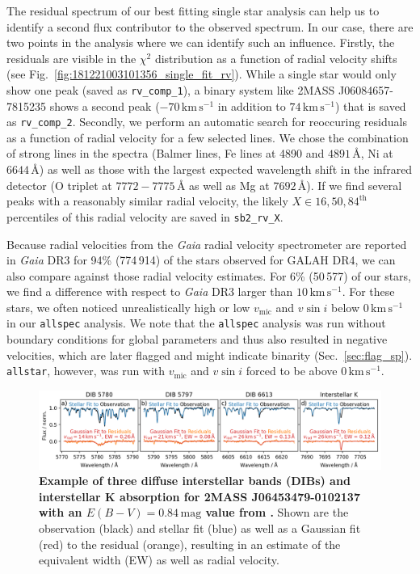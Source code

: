 \documentclass[
  journal=pasa,
  manuscript=research-paper, %
  year=2024,
  volume=37
]{cup-journal}
\newcommand{\vmic}{$v_\mathrm{mic}$\xspace}
\newcommand{\vsini}{$v \sin i$\xspace}
\newcommand{\Gaia}{\textit{Gaia}\xspace}
\begin{document}
The residual spectrum of our best fitting single star analysis can help us to identify a second flux contributor to the observed spectrum. In our case, there are two points in the analysis where we can identify such an influence. Firstly, the residuals are visible in the $\chi^2$ distribution as a function of radial velocity shifts (see Fig.~\ref{fig:181221003101356_single_fit_rv}). While a single star would only show one peak (saved as \texttt{rv\_comp\_1}), a binary system like 2MASS J06084657-7815235 shows a second peak ($-70\,\mathrm{km\,s^{-1}}$ in addition to $74\,\mathrm{km\,s^{-1}}$) that is saved as \texttt{rv\_comp\_2}. Secondly, we perform an automatic search for reoccuring residuals as a function of radial velocity for a few selected lines. We chose the combination of strong lines in the spectra (Balmer lines, Fe lines at 4890 and $4891\,\text{\AA}$, Ni at $6644\,\text{\AA}$) as well as those with the largest expected wavelength shift in the infrared detector (O triplet at $7772-7775\,\text{\AA}$ as well as Mg at $7692\,\text{\AA}$). If we find several peaks with a reasonably similar radial velocity, the likely $X \in {16,50,84}^\text{th}$ percentiles of this radial velocity are saved in \texttt{sb2\_rv\_X}.

Because radial velocities from the \Gaia radial velocity spectrometer \citep{Katz2023} are reported in \Gaia DR3 for 94\% (774\,914) of the stars observed for GALAH DR4, we can also compare against those radial velocity estimates. For 6\% (50\,577) of our stars, we find a difference with respect to \Gaia DR3 larger than $10\,\mathrm{km\,s^{-1}}$. For these stars, we often noticed unrealistically high or low \vmic and \vsini below $0\,\mathrm{km\,s^{-1}}$ in our \texttt{allspec} analysis. We note that the \texttt{allspec} analysis was run without boundary conditions for global parameters and thus also resulted in negative velocities, which are later flagged and might indicate binarity (Sec.~\ref{sec:flag_sp}). \texttt{allstar}, however, was run with \vmic and \vsini forced to be above $0\,\mathrm{km\,s^{-1}}$.

\begin{figure}[ht]
 \centering
 \includegraphics[width=\textwidth]{figures/example_dibs_06453479-0102137.png}
 \caption{\textbf{Example of three diffuse interstellar bands (DIBs) and interstellar K absorption for 2MASS J06453479-0102137 with an $E(B-V) = 0.84\,\mathrm{mag}$ value from \citet{Schlegel1998}.} Shown are the observation (black) and stellar fit (blue) as well as a Gaussian fit (red) to the residual (orange), resulting in an estimate of the equivalent width (EW) as well as radial velocity.} %
 \label{fig:example_dibs_06453479-0102137}
\end{figure}
\end{document}
